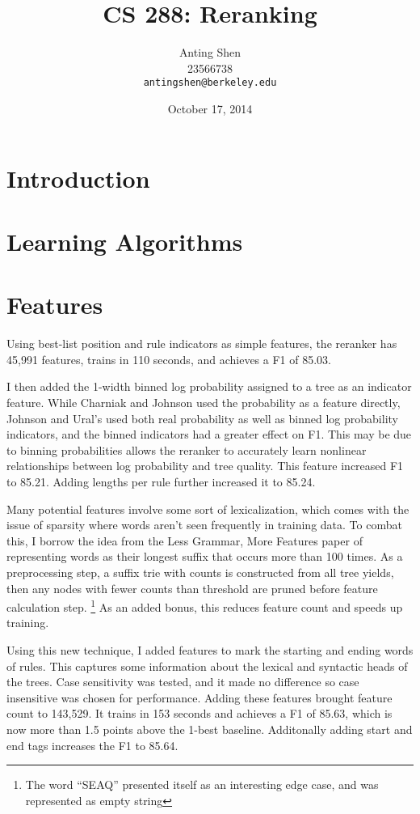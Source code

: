 \documentclass[11pt]{article}
\title{CS 288: Reranking}
\author{Anting Shen \\
  23566738 \\
  {\tt antingshen@berkeley.edu} \\
}
\date{October 17, 2014}
\begin{document}
\maketitle

\section{Introduction}


\section{Learning Algorithms}



\section{Features}

Using best-list position and rule indicators as simple features, the reranker has 45,991 features,
trains in 110 seconds, and achieves a F1 of 85.03.

I then added the 1-width binned log probability assigned to a tree as an indicator feature.
While Charniak and Johnson used the probability as a feature directly,
Johnson and Ural's used both real probability as well as binned log probability indicators,
and the binned indicators had a greater effect on F1. This may be due to binning probabilities
allows the reranker to accurately learn nonlinear relationships between log probability and tree quality.
This feature increased F1 to 85.21. Adding lengths per rule further increased it to 85.24.

Many potential features involve some sort of lexicalization, which comes with the issue of sparsity
where words aren't seen frequently in training data. To combat this, I borrow the idea from the
Less Grammar, More Features paper of representing words as their longest suffix that occurs more
than 100 times. As a preprocessing step, a suffix trie with counts is constructed from
all tree yields, then any nodes with fewer counts than threshold are pruned before feature calculation step.
\footnote{The word ``SEAQ'' presented itself as an interesting edge case, and was represented
as empty string} As an added bonus, this reduces feature count and speeds up training.

Using this new technique, I added features to mark the starting and ending words of rules.
This captures some information about the lexical and syntactic heads of the trees.
Case sensitivity was tested, and it made no difference so case insensitive was chosen for performance.
Adding these features brought feature count to 143,529. It trains in 153 seconds
and achieves a F1 of 85.63, which is now more than 1.5 points above the 1-best baseline.
Additonally adding start and end tags increases the F1 to 85.64.
\end{document}
